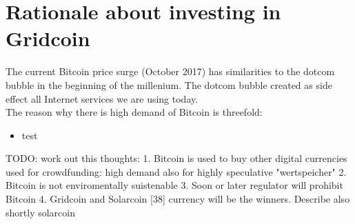 \section{Rationale about investing in Gridcoin}

The current Bitcoin price surge (October 2017) has similarities to the dotcom bubble in the beginning of the millenium. The dotcom bubble created as side effect all Internet services we are using today.\\

The reason why there is high demand of Bitcoin is threefold:\\

\begin{itemize}
  	\item{test}
\end{itemize}

TODO: work out this thoughts:
1. Bitcoin is used to buy other digital currencies used for crowdfunding: high demand also for highly speculative "wertspeicher"
2. Bitcoin is not enviromentally suistenable
3. Soon or later regulator will prohibit Bitcoin
4. Gridcoin and Solarcoin [38] currency will be the winners. Describe also shortly solarcoin